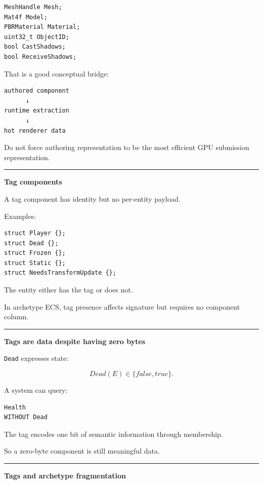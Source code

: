 \begin{verbatim}
MeshHandle Mesh;
Mat4f Model;
PBRMaterial Material;
uint32_t ObjectID;
bool CastShadows;
bool ReceiveShadows;
\end{verbatim}

That is a good conceptual bridge:

\begin{verbatim}
authored component
      ↓
runtime extraction
      ↓
hot renderer data
\end{verbatim}

Do not force authoring representation to be the most efficient GPU submission representation.

\begin{center}\rule{0.5\linewidth}{0.5pt}\end{center}

\textbf{Tag components}

A tag component has identity but no per-entity payload.

Examples:

\begin{verbatim}
struct Player {};
struct Dead {};
struct Frozen {};
struct Static {};
struct NeedsTransformUpdate {};
\end{verbatim}

The entity either has the tag or does not.

In archetype ECS, tag presence affects signature but requires no component column.

\begin{center}\rule{0.5\linewidth}{0.5pt}\end{center}

\textbf{Tags are data despite having zero bytes}

\texttt{Dead} expresses state:

\[
Dead(E)\in\{false,true\}.
\]

A system can query:

\begin{verbatim}
Health
WITHOUT Dead
\end{verbatim}

The tag encodes one bit of semantic information through membership.

So a zero-byte component is still meaningful data.

\begin{center}\rule{0.5\linewidth}{0.5pt}\end{center}

\textbf{Tags and archetype fragmentation}

